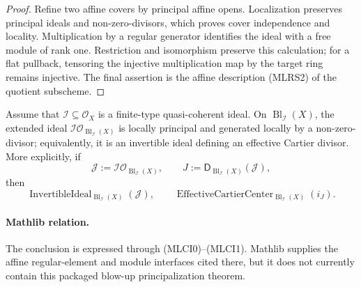 \begin{proof}
  Refine two affine covers by principal affine opens.  Localization preserves
  principal ideals and non-zero-divisors, which proves cover independence
  and locality.  Multiplication by a regular generator identifies the ideal
  with a free module of rank one.  Restriction and isomorphism preserve this
  calculation; for a flat pullback, tensoring the injective multiplication
  map by the target ring remains injective.  The final assertion is the
  affine description (MLRS2) of the quotient subscheme.
\end{proof}

\begin{theorem}
  \label{thm:nagata-blowup-principalizes-center}
  \leanok

  Assume that $\mathcal I\subseteq\mathcal O_X$ is a finite-type
  quasi-coherent ideal.  On $\operatorname{Bl}_{\mathcal I}(X)$, the extended ideal
  $\mathcal I\mathcal O_{\operatorname{Bl}_{\mathcal I}(X)}$ is locally
  principal and generated locally by a non-zero-divisor; equivalently, it is
  an
  invertible ideal defining an effective Cartier divisor.
  More explicitly, if
  \[
    \mathcal J:=
      \mathcal I\mathcal O_{\operatorname{Bl}_{\mathcal I}(X)},
    \qquad J:=\mathsf D_{\operatorname{Bl}_{\mathcal I}(X)}(\mathcal J),
  \]
  then
  \[
    \operatorname{InvertibleIdeal}_{\operatorname{Bl}_{\mathcal I}(X)}
      (\mathcal J),
    \qquad
    \operatorname{EffectiveCartierCenter}_{\operatorname{Bl}_{\mathcal I}(X)}
      (i_J).
  \]

  \paragraph{Mathlib relation.}
  The conclusion is expressed through (MLCI0)--(MLCI1).  Mathlib supplies
  the affine regular-element and module interfaces cited there, but it does
  not currently contain this packaged blow-up principalization theorem.


\end{theorem}
